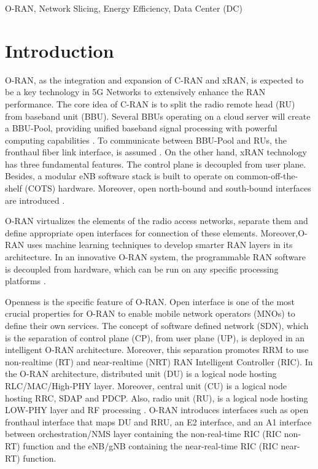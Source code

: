 \documentclass[conference]{IEEEtran}
\begin{document}
\begin{IEEEkeywords}
O-RAN, Network Slicing, Energy Efficiency, Data Center (DC)
\end{IEEEkeywords}

\section{Introduction}
O-RAN, as the integration and expansion of C-RAN and xRAN, is expected to be a key technology in 5G Networks to extensively enhance the RAN performance. The core idea of C-RAN is to split the radio remote head (RU) from baseband unit (BBU). Several BBUs operating on a cloud server will create a BBU-Pool, providing unified baseband signal processing with powerful computing capabilities \cite{cran1}. To communicate between BBU-Pool and RUs, the fronthaul fiber link interface, is assumed \cite{frdl,simeone2016cloud,motalleb2017optimal}. On the other hand, xRAN technology has three fundamental features. The control plane is decoupled from user plane. Besides, a modular eNB software stack is built to operate on common-off-the-shelf (COTS) hardware. Moreover, open north-bound and south-bound interfaces are introduced \cite{xran}.

O-RAN virtualizes the elements of the radio access networks, separate them and define appropriate open interfaces for connection of these elements. Moreover,O-RAN uses machine learning techniques to develop smarter RAN layers in its architecture. In an innovative O-RAN system, the programmable RAN software is decoupled from hardware, which can be run on any specific processing platforms \cite{oran1}.

Openness is the specific feature of O-RAN. Open interface is one of the most crucial properties for O-RAN to enable mobile network operators (MNOs) to define their own services.
The concept of software defined network (SDN), which is the separation of control plane (CP), from user plane (UP), is deployed in an intelligent O-RAN architecture. Moreover, this separation promotes RRM to use non-realtime (RT) and near-realtime (NRT) RAN Intelligent Controller (RIC). 
In the O-RAN architecture, distributed unit (DU) is a logical node hosting RLC/MAC/High-PHY layer. 
Moreover, central unit (CU) is a logical node hosting RRC, SDAP and PDCP.
Also, radio unit (RU),  is a logical node hosting LOW-PHY layer and 
RF processing \cite{oranpaper}.
O-RAN introduces interfaces such as open fronthaul interface that maps DU and RRU, an E2 interface, and an A1 interface between orchestration/NMS layer containing the non-real-time RIC
(RIC non-RT) function and the eNB/gNB containing the near-real-time RIC
(RIC near-RT) function.
\end{document}
